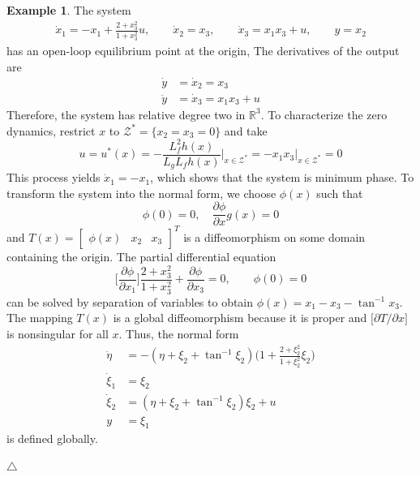 \documentclass[11pt,a4paper,oneside]{book}
\numberwithin{equation}{section}
\theoremstyle{it}
\theoremstyle{definition}
\newtheorem{example}{Example}[section]
\begin{document}
\begin{example}
	The system
	\begin{equation*}
	\begin{aligned}
		\dot{x}_1=-x_1+\frac{2+x_3^2}{1+x_3^2}u,\qquad
		\dot{x}_2=x_3,\qquad
		\dot{x}_3=x_1x_3+u,\qquad
		y=x_2
	\end{aligned}
	\end{equation*}
	has an open-loop equilibrium point at the origin, The derivatives of the output are
	\begin{equation*}
	\begin{aligned}
		\dot{y}&=\dot{x}_2=x_3 \\[6pt]
		\ddot{y}&=\dot{x}_3=x_1x_3+u
	\end{aligned}
	\end{equation*}	
	Therefore, the system has relative degree two in $\mathbb{R}^3$. To characterize the zero dynamics, restrict $x$ to $\mathscr{Z}^*=\{x_2=x_3=0\}$ and take
	\begin{equation*}
		u=u^*(x)=-\frac{L_f^2h(x)}{L_gL_fh(x)}\Big|_{x\in\mathscr{Z}^*}=-x_1x_3\Big|_{x\in\mathscr{Z}^*}=0
	\end{equation*}
	This process yields $\dot{x}_1=-x_1$, which shows that the system is minimum phase. To transform the system into the normal form, we choose $\phi(x)$ such that 
	\begin{equation*}
		\phi(0)=0,\quad\frac{\partial \phi}{\partial x}g(x)=0
	\end{equation*}
	and $T(x)=\begin{bmatrix} \phi(x)&x_2&x_3 \end{bmatrix}^T$ is a diffeomorphism on some domain containing the origin. The partial differential equation
	\begin{equation*}
		\Bigg[\frac{\partial \phi}{\partial x_1}\Bigg]\frac{2+x_3^2}{1+x_3^2}+\frac{\partial \phi}{\partial x_3}=0,\qquad\phi(0)=0
	\end{equation*}
	can be solved by separation of variables to obtain $\phi(x)=x_1-x_3-\tan^{-1}x_3$. The mapping $T(x)$ is a global diffeomorphism because it is proper and $\big[\partial T/\partial x\big]$ is nonsingular for all $x$. Thus, the normal form
	\begin{equation*}
		\begin{aligned}
			\dot{\eta} &= -(\eta+\xi_2+\tan^{-1}\xi_2)\Big(1+\frac{2+\xi_2^2}{1+\xi_2^2}\xi_2\Big) \\[6pt]
			\dot{\xi}_1 &= \xi_2 \\[6pt]
			\dot{\xi}_2 &= (\eta+\xi_2+\tan^{-1}\xi_2)\xi_2+u\\[6pt]
			y&=\xi_1
		\end{aligned}
	\end{equation*}
	is defined globally.
		
	\hfill $\triangle$
\end{example}
\end{document}
